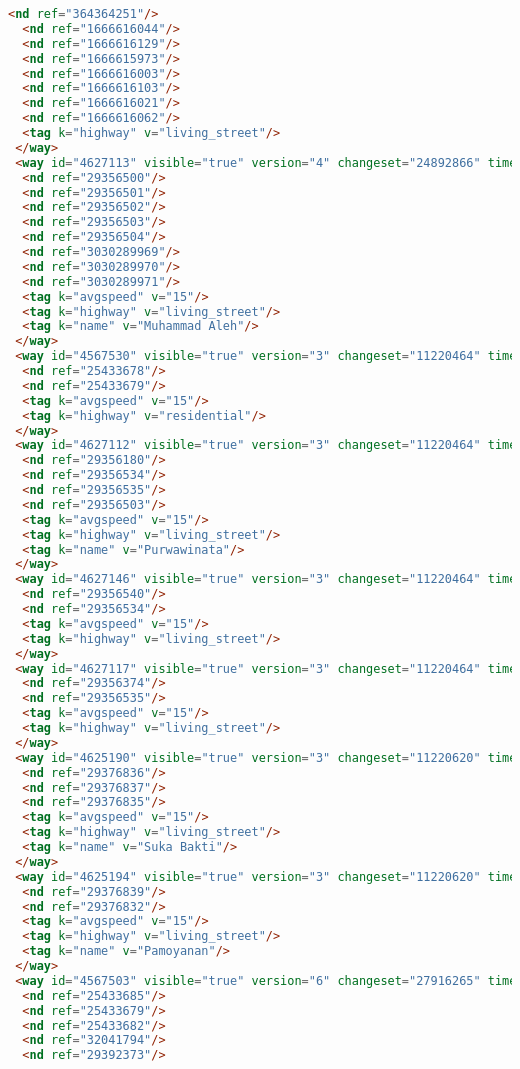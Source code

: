 \begin{lstlisting}[language=HTML,basicstyle=\tiny,caption=test.xml]
  <nd ref="364364251"/>
  <nd ref="1666616044"/>
  <nd ref="1666616129"/>
  <nd ref="1666615973"/>
  <nd ref="1666616003"/>
  <nd ref="1666616103"/>
  <nd ref="1666616021"/>
  <nd ref="1666616062"/>
  <tag k="highway" v="living_street"/>
 </way>
 <way id="4627113" visible="true" version="4" changeset="24892866" timestamp="2014-08-20T18:40:32Z" user="albahrimaraxsa" uid="2162153">
  <nd ref="29356500"/>
  <nd ref="29356501"/>
  <nd ref="29356502"/>
  <nd ref="29356503"/>
  <nd ref="29356504"/>
  <nd ref="3030289969"/>
  <nd ref="3030289970"/>
  <nd ref="3030289971"/>
  <tag k="avgspeed" v="15"/>
  <tag k="highway" v="living_street"/>
  <tag k="name" v="Muhammad Aleh"/>
 </way>
 <way id="4567530" visible="true" version="3" changeset="11220464" timestamp="2012-04-08T02:49:10Z" user="andryono" uid="643030">
  <nd ref="25433678"/>
  <nd ref="25433679"/>
  <tag k="avgspeed" v="15"/>
  <tag k="highway" v="residential"/>
 </way>
 <way id="4627112" visible="true" version="3" changeset="11220464" timestamp="2012-04-08T02:49:12Z" user="andryono" uid="643030">
  <nd ref="29356180"/>
  <nd ref="29356534"/>
  <nd ref="29356535"/>
  <nd ref="29356503"/>
  <tag k="avgspeed" v="15"/>
  <tag k="highway" v="living_street"/>
  <tag k="name" v="Purwawinata"/>
 </way>
 <way id="4627146" visible="true" version="3" changeset="11220464" timestamp="2012-04-08T02:49:12Z" user="andryono" uid="643030">
  <nd ref="29356540"/>
  <nd ref="29356534"/>
  <tag k="avgspeed" v="15"/>
  <tag k="highway" v="living_street"/>
 </way>
 <way id="4627117" visible="true" version="3" changeset="11220464" timestamp="2012-04-08T02:49:13Z" user="andryono" uid="643030">
  <nd ref="29356374"/>
  <nd ref="29356535"/>
  <tag k="avgspeed" v="15"/>
  <tag k="highway" v="living_street"/>
 </way>
 <way id="4625190" visible="true" version="3" changeset="11220620" timestamp="2012-04-08T04:00:41Z" user="andryono" uid="643030">
  <nd ref="29376836"/>
  <nd ref="29376837"/>
  <nd ref="29376835"/>
  <tag k="avgspeed" v="15"/>
  <tag k="highway" v="living_street"/>
  <tag k="name" v="Suka Bakti"/>
 </way>
 <way id="4625194" visible="true" version="3" changeset="11220620" timestamp="2012-04-08T04:00:42Z" user="andryono" uid="643030">
  <nd ref="29376839"/>
  <nd ref="29376832"/>
  <tag k="avgspeed" v="15"/>
  <tag k="highway" v="living_street"/>
  <tag k="name" v="Pamoyanan"/>
 </way>
 <way id="4567503" visible="true" version="6" changeset="27916265" timestamp="2015-01-04T18:11:06Z" user="isonpurba" uid="2552445">
  <nd ref="25433685"/>
  <nd ref="25433679"/>
  <nd ref="25433682"/>
  <nd ref="32041794"/>
  <nd ref="29392373"/>

\end{lstlisting}
